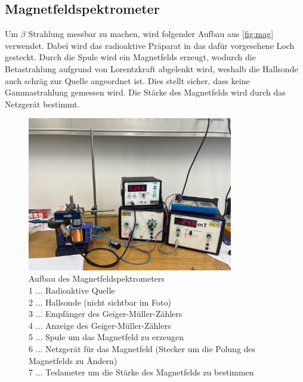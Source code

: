 \documentclass[12pt,english,ngerman]{scrartcl}
\begin{document}
\subsection{Magnetfeldspektrometer}\label{sec:aufbau_Magnetfeldspektrometer}

Um \(\beta\) Strahlung messbar zu machen, wird folgender Aufbau aus
\autoref{fig:mag} verwendet. Dabei wird das radioaktive Präparat in das dafür
vorgesehene Loch gesteckt. Durch die Spule wird ein Magnetfelds erzeugt,
wodurch die Betastrahlung aufgrund von Lorentzkraft abgelenkt wird, weshalb die
Hallsonde auch schräg zur Quelle angeordnet ist. Dies stellt sicher, dass keine
Gammastrahlung gemessen wird. Die Stärke des Magnetfelds wird durch das
Netzgerät bestimmt.

\begin{figure}[H]
	\begin{center}
		\includegraphics[width = 0.8\textwidth]{./figures/mag_new.png}
	\end{center}
	\caption[Aufbau des Magnetfeldspektrometers]{Aufbau des Magnetfeldspektrometers \\
		1 \(\dots\) Radioaktive Quelle \\
		2 \(\dots\) Hallsonde (nicht sichtbar im Foto) \\
		3 \(\dots\) Empfänger des Geiger-Müller-Zählers \\
		4 \(\dots\) Anzeige des Geiger-Müller-Zählers \\
		5 \(\dots\) Spule um das Magnetfeld zu erzeugen \\
		6 \(\dots\) Netzgerät für das Magnetfeld (Stecker um die Polung des Magnetfelds zu Ändern) \\
		7 \(\dots\) Teslameter um die Stärke des Magnetfelds zu bestimmen}
	\label{fig:mag}

\end{figure}
\end{document}
